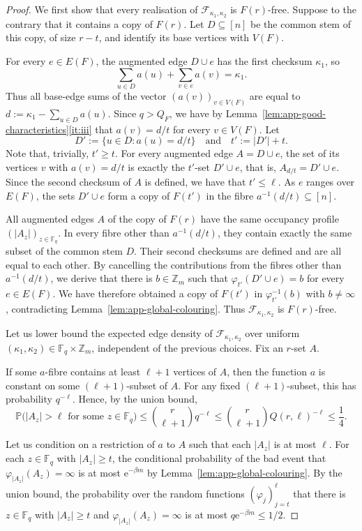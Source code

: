 \documentclass[12pt,a4paper]{article}
\numberwithin{equation}{section}
\theoremstyle{definition}
\theoremstyle{remark}
\newcommand{\Z}[1]{\mathbb Z_{#1}}
\newcommand{\me}{\mathrm{e}}
\newcommand{\n}[2]{|#2_{#1}|}
\newcommand{\F}[2]{\mathcal F_{#1,#2}}
\newcommand{\PP}{m}
\begin{document}
\begin{proof}
We first show that every realisation of $\F{\kappa_1}{\kappa_2}$ is $F(r)$-free.  Suppose to the contrary that it contains a copy of $F(r)$.  Let $D\subseteq [n]$ be the common stem of this copy, of size $r-t$, and identify its base vertices with $V(F)$.


For every $e\in E(F)$, the augmented edge $D\cup e$ has the first checksum $\kappa_1$, so
\[
 \sum_{u\in D}a(u)+\sum_{v\in e}a(v)=\kappa_1.
\]
Thus all base-edge sums of the vector $(a(v))_{v\in V(F)}$ are equal to $d:=\kappa_1-\sum_{u\in D}a(u)$.
Since $q>Q_F$, we have by Lemma~\ref{lem:app-good-characteristics}\ref{it:iii} that 
 $a(v)=d/t$ for every $v\in V(F)$.
Let
\[
 D':=\{u\in D:a(u)=d/t\}
 \quad\text{and}\quad t':=|D'|+t.
\]
 Note that, trivially, $t'\ge t$.
For every augmented edge $A=D\cup e$, the set of its vertices $v$ with $a(v)=d/t$ is exactly the $t'$-set $D'\cup e$, that is, $A_{d/t}=D'\cup e$. Since the second checksum of $A$ is defined, we have that $t'\le \ell$.   As $e$ ranges over $E(F)$, the sets $D'\cup e$ form a copy of $F(t')$ in the fibre $a^{-1}(d/t)\subseteq [n]$. 

All augmented edges $A$ of the copy of $F(r)$ have the same  occupancy profile $(\n{z}{A})_{z\in\mathbb F_q}$.  In every fibre other than $a^{-1}(d/t)$, they contain exactly the same subset of the common stem $D$. Their second checksums are defined and are all equal to each other. By cancelling the contributions from the fibres other than $a^{-1}(d/t)$, we derive that there is $b\in \Z{\PP}$ such that $\varphi_{t'}(D'\cup e)=b$ for every $e\in E(F)$.
We have therefore obtained a copy of $F(t')$ in $\varphi_{t'}^{-1}(b)$ with $b\not=\infty$, contradicting Lemma~\ref{lem:app-global-colouring}.  Thus $\F{\kappa_1}{\kappa_2}$ is $F(r)$-free.

Let us lower bound the expected edge density of $\F{\kappa_1}{\kappa_2}$ over uniform $(\kappa_1,\kappa_2)\in \mathbb F_q\times\Z{\PP}$, independent of the previous choices. Fix an $r$-set $A$.


If some $a$-fibre contains at least $\ell+1$ vertices of $A$, then the function $a$ is constant on some $(\ell+1)$-subset of $A$. For any fixed $(\ell+1)$-subset, this has probability $q^{-\ell}$.  Hence, by the union bound,
\begin{equation*}
 \mathbb P\bigl(\n{z}{A}>\ell\text{ for some }z\in\mathbb F_q\bigr)
 \le\binom r{\ell+1}q^{-\ell}
 \le\binom r{\ell+1}Q(r,\ell)^{-\ell}
 \le\frac14.
\end{equation*}

Let us condition on a restriction of $a$ to $A$ such that
each $\n{z}{A}$ is at most $\ell$. For each $z\in\mathbb F_q$ with $\n{z}{A}\ge t$, the conditional probability of the bad event that $\varphi_{\n{z}{A}}(A_z)=\infty$ is at most $\me^{-\beta \PP}$ by Lemma~\ref{lem:app-global-colouring}. 
By the union bound, the probability over the random functions $(\varphi_j)_{j=t}^{\ell}$ that there is $z\in\mathbb F_q$ with $\n{z}{A}\ge t$ and $\varphi_{\n{z}{A}}(A_z)=\infty$
is at most $q\me^{-\beta \PP}\le 1/2$. 


\end{proof}
\end{document}
